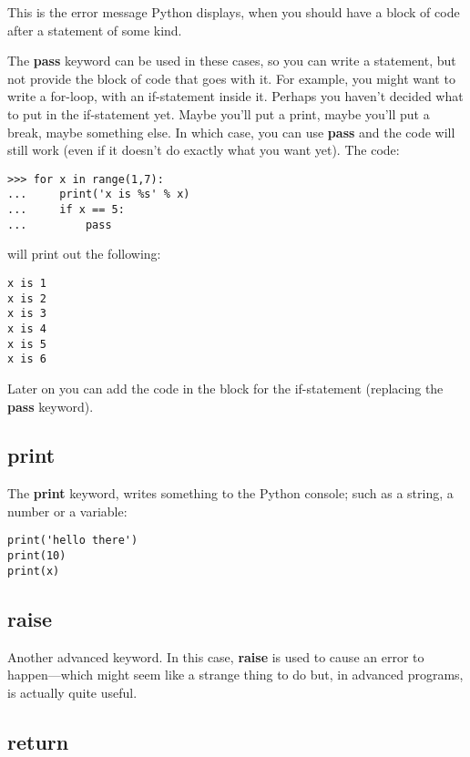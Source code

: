 This is the error message Python displays, when you should have a block of code after a statement of some kind.
\par
The \textbf{pass} keyword can be used in these cases, so you can write a statement, but not provide the block of code that goes with it.  For example, you might want to write a for-loop, with an if-statement inside it.  Perhaps you haven't decided what to put in the if-statement yet.  Maybe you'll put a print, maybe you'll put a break, maybe something else.  In which case, you can use \textbf{pass} and the code will still work (even if it doesn't do exactly what you want yet).  The code:

\begin{Verbatim}[frame=single]
>>> for x in range(1,7):
...     print('x is %s' % x)
...     if x == 5:
...         pass
\end{Verbatim}

\noindent
will print out the following:

\begin{Verbatim}[frame=single]
x is 1
x is 2
x is 3
x is 4
x is 5
x is 6
\end{Verbatim}

\noindent
Later on you can add the code in the block for the if-statement (replacing the \textbf{pass} keyword).

\subsection*{print}

The \textbf{print} keyword, writes something to the Python console; such as a string, a number or a variable:

\begin{Verbatim}[frame=single]
print('hello there')
print(10)
print(x)
\end{Verbatim}

\subsection*{raise}

Another advanced keyword.  In this case, \textbf{raise} is used to cause an error to happen---which might seem like a strange thing to do but, in advanced programs, is actually quite useful.

\subsection*{return}

